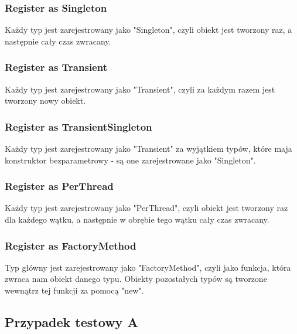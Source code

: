 \documentclass[12pt]{article}
\begin{document}
\subsubsection{Register as Singleton}
Każdy typ jest zarejestrowany jako "Singleton", czyli obiekt jest tworzony raz, a następnie cały czas zwracany.

\subsubsection{Register as Transient}
Każdy typ jest zarejestrowany jako "Transient", czyli za każdym razem jest tworzony nowy obiekt.

\subsubsection{Register as TransientSingleton}
Każdy typ jest zarejestrowany jako "Transient" za wyjątkiem typów, które maja konstruktor bezparametrowy - są one zarejestrowane jako "Singleton".

\subsubsection{Register as PerThread}
Każdy typ jest zarejestrowany jako "PerThread", czyli obiekt jest tworzony raz dla każdego wątku, a następnie w obrębie tego wątku cały czas zwracany.

\subsubsection{Register as FactoryMethod}
Typ główny jest zarejestrowany jako "FactoryMethod", czyli jako funkcja, która zwraca nam obiekt danego typu. Obiekty pozostałych typów są tworzone wewnątrz tej funkcji za pomocą "new".

\subsection{Przypadek testowy A}
\end{document}
